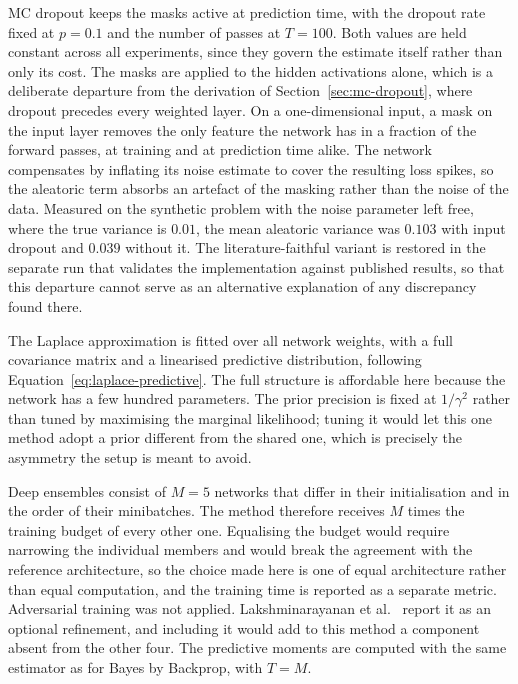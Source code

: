 MC dropout keeps the masks active at prediction time, with the dropout rate fixed at
$p = 0.1$ and the number of passes at $T = 100$. Both values are held constant across
all experiments, since they govern the estimate itself rather than only its cost.
The masks are applied to the hidden activations alone, which is a deliberate departure
from the derivation of Section~\ref{sec:mc-dropout}, where dropout precedes every
weighted layer. On a one-dimensional input, a mask on the input layer removes the only
feature the network has in a fraction of the forward passes, at training and at
prediction time alike. The network compensates by inflating its noise estimate to cover
the resulting loss spikes, so the aleatoric term absorbs an artefact of the masking
rather than the noise of the data. Measured on the synthetic problem with the noise
parameter left free, where the true variance is $0.01$, the mean aleatoric variance was
$0.103$ with input dropout and $0.039$ without it. The literature-faithful variant is
restored in the separate run that validates the implementation against published
results, so that this departure cannot serve as an alternative explanation of any
discrepancy found there.

The Laplace approximation is fitted over all network weights, with a full covariance
matrix and a linearised predictive distribution, following
Equation~\eqref{eq:laplace-predictive}. The full structure is affordable here because
the network has a few hundred parameters. The prior precision is fixed at $1/\gamma^2$
rather than tuned by maximising the marginal likelihood; tuning it would let this one
method adopt a prior different from the shared one, which is precisely the asymmetry
the setup is meant to avoid.

Deep ensembles consist of $M = 5$ networks that differ in their initialisation and in
the order of their minibatches. The method therefore receives $M$ times the training
budget of every other one. Equalising the budget would require narrowing the individual
members and would break the agreement with the reference architecture, so the choice made
here is one of equal architecture rather than equal computation, and the training time is
reported as a separate metric. Adversarial training was not applied. Lakshminarayanan
et al.~\cite{lakshminarayanan2017} report it as an optional refinement, and including
it would add to this method a component absent from the other four. The predictive
moments are computed with the same estimator as for Bayes by Backprop, with $T = M$.

